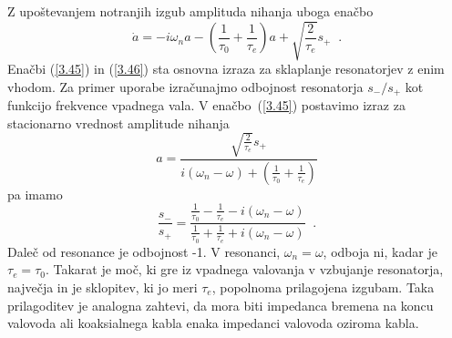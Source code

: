 Z upoštevanjem notranjih izgub amplituda nihanja uboga enačbo 
\begin{equation}
\dot{a}=-i\omega_{n}a-(\frac{1}{\tau_{0}}+\frac{1}{\tau_{e}})a+\sqrt{\frac{2}{\tau_{e}}}s_{+}\;\;.
\label{3.46}
\end{equation}
 Enačbi (\ref{3.45}) in (\ref{3.46}) sta osnovna izraza za sklaplanje
resonatorjev z enim vhodom. Za primer uporabe izračunajmo odbojnost
resonatorja $s_{-}/s_{+}$ kot funkcijo frekvence vpadnega vala. V
enačbo~(\ref{3.45}) postavimo izraz za stacionarno vrednost amplitude
nihanja 
\begin{equation}
a=\frac{\sqrt{\frac{2}{\tau_{e}}}s_{+}}{i(\omega_{n}-\omega)+(\frac{1}{\tau_{0}}+\frac{1}{\tau_{e}})}
\label{3.47}
\end{equation}
 pa imamo 
\begin{equation}
\frac{s_{-}}{s_{+}}=\frac{\frac{1}{\tau_{0}}-\frac{1}{\tau_{e}}-i(\omega_{n}-\omega)}{\frac{1}{\tau_{0}}
+\frac{1}{\tau_{e}}+i(\omega_{n}-\omega)}\;\;.\label{3.48}
\end{equation}
 Daleč od resonance je odbojnost -1. V resonanci, $\omega_{n}=\omega$,
odboja ni, kadar je $\tau_{e}=\tau_{0}$. Takarat je moč, ki gre iz
vpadnega valovanja v vzbujanje resonatorja, največja in je sklopitev,
ki jo meri $\tau_{e}$, popolnoma prilagojena izgubam. Taka prilagoditev
je analogna zahtevi, da mora biti impedanca bremena na koncu valovoda
ali koaksialnega kabla enaka impedanci valovoda oziroma kabla.


